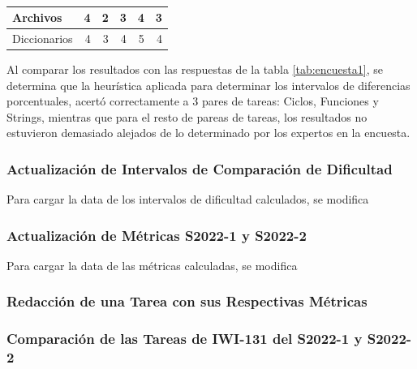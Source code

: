 \documentclass[letterpaper,12pt]{article}
\begin{document}
\begin{table}[H]
\begin{tabular}{|l|r|r|r|r|r|}
    Archivos        & 4                                                                                                & 2                                           & 3                                      & 4                                     & 3                                      \\ \hline
    Diccionarios    & 4                                                                                                & 3                                           & 4                                      & 5                                     & 4                                      \\ \hline
  \end{tabular}
  \caption{}
  \label{tab:difDifferences}
\end{table}
Al comparar los resultados con las respuestas de la tabla \ref{tab:encuesta1}, se determina que la heurística aplicada para determinar los intervalos de diferencias porcentuales, acertó correctamente a 3 pares de tareas: Ciclos, Funciones y Strings, mientras que para el resto de pareas de tareas, los resultados no estuvieron demasiado alejados de lo determinado por los expertos en la encuesta.

\subsubsection{Actualización de Intervalos de Comparación de Dificultad}

Para cargar la data de los intervalos de dificultad calculados, se modifica

\subsubsection{Actualización de Métricas S2022-1 y S2022-2}

Para cargar la data de las métricas calculadas, se modifica

\subsubsection{Redacción de una Tarea con sus Respectivas Métricas}

\subsubsection{Comparación de las Tareas de IWI-131 del S2022-1 y S2022-2}

\newpage
\end{document}
